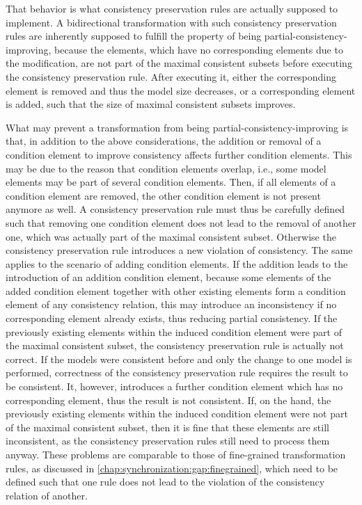 That behavior is what consistency preservation rules are actually supposed to implement.
A bidirectional transformation with such consistency preservation rules are inherently supposed to fulfill the property of being partial-consistency-improving, because the elements, which have no corresponding elements due to the modification, are not part of the maximal consistent subsets before executing the consistency preservation rule.
After executing it, either the corresponding element is removed and thus the model size decreases, or a corresponding element is added, such that the size of maximal consistent subsets improves.

What may prevent a transformation from being partial-consistency-improving is that, in addition to the above considerations, the addition or removal of a condition element to improve consistency affects further condition elements.
This may be due to the reason that condition elements overlap, i.e., some model elements may be part of several condition elements.
Then, if all elements of a condition element are removed, the other condition element is not present anymore as well.
A consistency preservation rule must thus be carefully defined such that removing one condition element does not lead to the removal of another one, which was actually part of the maximal consistent subset.
Otherwise the consistency preservation rule introduces a new violation of consistency.
The same applies to the scenario of adding condition elements. 
If the addition leads to the introduction of an addition condition element, because some elements of the added condition element together with other existing elements form a condition element of any consistency relation, this may introduce an inconsistency if no corresponding element already exists, thus reducing partial consistency.
If the previously existing elements within the induced condition element were part of the maximal consistent subset, the consistency preservation rule is actually not correct.
If the models were consistent before and only the change to one model is performed, correctness of the consistency preservation rule requires the result to be consistent.
It, however, introduces a further condition element which has no corresponding element, thus the result is not consistent.
If, on the hand, the previously existing elements within the induced condition element were not part of the maximal consistent subset, then it is fine that these elements are still inconsistent, as the consistency preservation rules still need to process them anyway.
These problems are comparable to those of fine-grained transformation rules, as discussed in \autoref{chap:synchronization:gap:finegrained}, which need to be defined such that one rule does not lead to the violation of the consistency relation of another.

